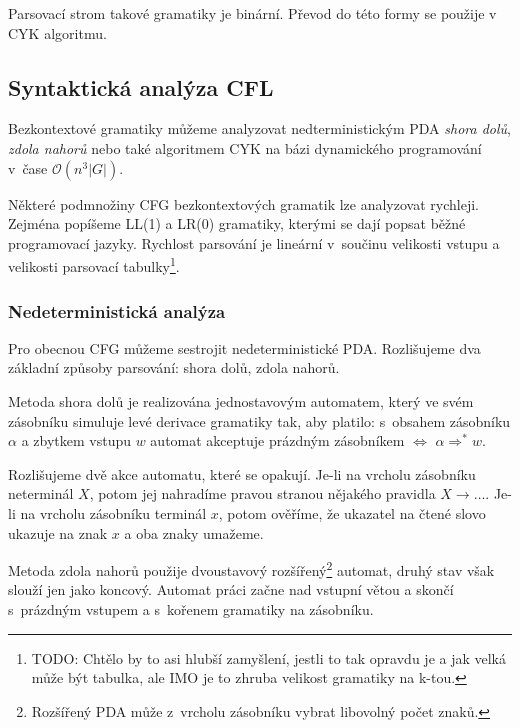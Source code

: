 Parsovací strom takové gramatiky je binární. Převod do této formy se
použije v CYK algoritmu.


\subsection{Syntaktická analýza CFL}

Bezkontextové gramatiky můžeme analyzovat nedterministickým PDA
{\em shora dolů}, {\em zdola nahorů} nebo také algoritmem CYK na bázi
dynamického programování v~čase $\mathcal{O}(n^3 \lvert G \rvert)$.

Některé podmnožiny CFG bezkontextových gramatik lze analyzovat rychleji.
Zejména popíšeme LL(1) a LR(0) gramatiky, kterými se dají popsat běžné
programovací jazyky. Rychlost parsování je lineární v~součinu velikosti
vstupu a velikosti parsovací tabulky\footnote{TODO: Chtělo by to asi hlubší
zamyšlení, jestli to tak opravdu je a jak velká může být tabulka, ale
IMO je to zhruba velikost gramatiky na k-tou.}.

\subsubsection{Nedeterministická analýza}

Pro obecnou CFG můžeme sestrojit nedeterministické PDA. Rozlišujeme dva
základní způsoby parsování: shora dolů, zdola nahorů.

Metoda shora dolů je realizována jednostavovým automatem, který ve svém
zásobníku simuluje levé derivace gramatiky tak, aby platilo:
s~obsahem zásobníku $\alpha$ a zbytkem vstupu $w$ automat akceptuje
prázdným zásobníkem $\iff$ $\alpha \Rightarrow^* w$.

Rozlišujeme dvě akce automatu, které se opakují.
Je-li na vrcholu zásobníku neterminál
$X$, potom jej nahradíme pravou stranou nějakého pravidla $X \to
\ldots$. Je-li na vrcholu zásobníku terminál $x$, potom ověříme,
že ukazatel na čtené slovo ukazuje na znak $x$ a oba znaky umažeme.

\begin{example}

\end{example}

Metoda zdola nahorů použije dvoustavový rozšířený\footnote{Rozšířený
PDA může z~vrcholu zásobníku vybrat libovolný počet znaků.} automat, druhý
stav však slouží jen jako koncový. Automat práci začne
nad vstupní větou a skončí s~prázdným vstupem a s~kořenem gramatiky na
zásobníku.

